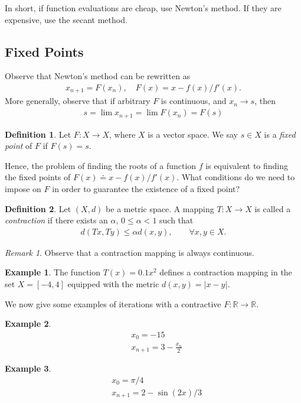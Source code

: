 \documentclass[12pt]{article}
\newcommand{\rr}{\mathbb{R}}
\theoremstyle{plain}
\theoremstyle{definition}
\newtheorem*{definition}{Definition}
\newtheorem*{example}{Example}
\theoremstyle{remark}
\newtheorem*{remark}{Remark}
\numberwithin{equation}{section}  %
\begin{document}
In short, if function evaluations are cheap, use Newton's method. If they are
expensive, use the secant method.
\subsection{Fixed Points}
Observe that Newton's method can be rewritten as 
\begin{align*}
x_{n+1} = F(x_n), \quad F(x) = x - f(x)/f'(x).
\end{align*}
More generally, observe that if arbitrary $F$ is continuous, and
$x_n \to s$, then
\begin{align*}
s = \lim {x_{n+1}} = \lim F(x_n) = F(s)
\end{align*}
\begin{definition}
Let $F: X \to X$, where $X$ is a vector space. We say $s \in X$ is a 
\emph{fixed point} of $F$ if $F(s) = s$.
\end{definition}
Hence, the problem of finding the roots of a function $f$ is equivalent
to finding the fixed points of $F(x) \doteq x - f(x)/f'(x)$.
What conditions do we need to impose on $F$ in order to guarantee
the existence of a fixed point?
\begin{definition}
  Let $\left( X, d \right)$ be a metric space. A mapping $T: X \to X$ is called a
\emph{contraction} if there exists an $\alpha$, $0 \le \alpha <1$ such that
\begin{equation*}
	\begin{split}
		d(Tx, Ty) \le \alpha d(x,y), \qquad \forall x, y \in X.
	\end{split}
\end{equation*}
\end{definition}
\begin{remark}
	Observe that a contraction mapping is always continuous.
\end{remark}
\begin{example}
	The function $T(x) = 0.1x^2$ defines a contraction mapping in the set 
	$X = [-4, 4]$ equipped with the metric $d(x,y) = |x-y|$. 
\end{example}
We now give some examples of iterations with a contractive $F: \rr \to \rr$.
\begin{example}
\begin{align*}
& x_0 = -15
\\
& x_{n+1} = 3 - \frac{x_n}{2}
\end{align*}
\end{example}
\begin{example}
\begin{align*}
& x_0 = \pi/4
\\
& x_{n+1} = 2 - \sin(2x)/3
\end{align*}
\end{example} 
\end{document}
